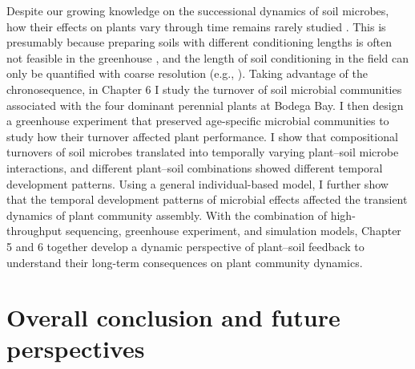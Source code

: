 Despite our growing knowledge on the successional dynamics of soil microbes, how their effects on plants vary through time remains rarely studied \citep{Kardol2013, Lepinay2018}. This is presumably because preparing soils with different conditioning lengths is often not feasible in the greenhouse \citep{Kardol2013, Kulmatiski2018}, and the length of soil conditioning in the field can only be quantified with coarse resolution (e.g., \citealp{Day2015, Speek2015}). 
Taking advantage of the chronosequence, in Chapter 6 I study the turnover of soil microbial communities associated with the four dominant perennial plants at Bodega Bay. I then design a greenhouse experiment that preserved age-specific microbial communities to study how their turnover affected plant performance.
I show that compositional turnovers of soil microbes translated into temporally varying plant--soil microbe interactions, and different plant--soil combinations showed different temporal development patterns. 
Using a general individual-based model, I further show that the temporal development patterns of microbial effects affected the transient dynamics of plant community assembly. 
With the combination of high-throughput sequencing, greenhouse experiment, and simulation models, Chapter 5 and 6 together develop a dynamic perspective of plant--soil feedback to understand their long-term consequences on plant community dynamics.
\par


\section{Overall conclusion and future perspectives}
\begin{comment}
Since the beginning of community ecology as a sub-discipline, the phenomenological Lotka--Volterra competition model has offered first-order approximation for understanding species competitive outcome. My dissertation, taken together, highlights the effects of non-competitive multi-trophic level interactions and age-specific interactions on species coexistence.
Our modeling framework in Chapter 4 can be applied to other trophic levels that encompass a variety of species interaction type.
In Chapter 6, we see changes in interaction strength with soil conditioning length. This is also a general phenomenon that applies to almost all multi-cellular organisms.
Temporal development of PSF has a strong effect on the transient dynamics, indicating a broad spectrum of interesting interactions among temporal dynamics.
Building from here, my future work will study the interaction among different time scales.
\par
\end{comment}



